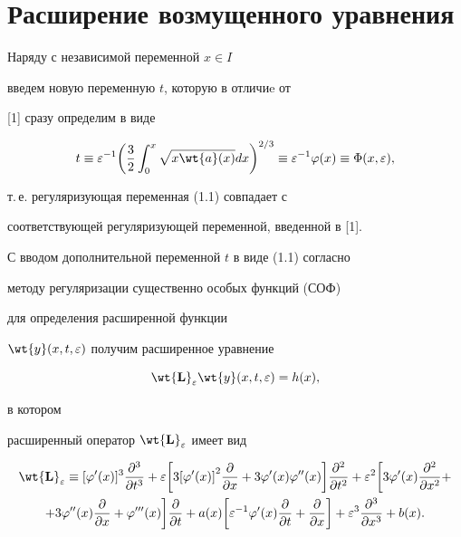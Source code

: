 \section{Расширение возмущенного уравнения}





Наряду с независимой переменной $x \in I$


введем новую переменную $t$, которую в отличиe от


[1] сразу определим в виде


\begin{equation}


t \equiv \e^{-1}\bigg( \frac{3}{2} \int_0^x \sqrt{x \wt{a}


(x)} d x \bigg)^{2/3}\equiv \e^{-1} \f (x) \equiv \Phi (x, \e),


\end{equation}


т.\,е. регуляризующая переменная (1.1) совпадает с


соответствующей регуляризующей переменной, введенной в [1].





С вводом дополнительной переменной $t$ в виде (1.1) согласно


методу регуляризации существенно особых функций (СОФ)


для определения расширенной функции


$\wt{y} (x, t, \e )$ получим расширенное уравнение


\begin{equation}


\wt{\bold{L}}_{\e} \wt{y} (x, t, \e ) = h(x),


\end{equation}


в котором


расширенный оператор $\wt{\bold{L}}_{\e}$ имеет вид


\begin{multline}


\wt{\bold{L}}_{\e} \equiv [{\f ' (x)}]^3 \frac{\d^3}{\d


t^3} + \e \bigg[3 [{\f ' (x)]}^2 \frac{\d}{\d x} + 3 \f ' (x) \f


'' (x) \bigg] \frac{\d^2}{\d t^2} + \e^{2} \bigg[ 3 \f ' (x)


\frac{\d^2}{\d x^2 } + \\


%


+ 3 \f '' (x) \frac{\d}{\d x} + \f ''' (x) \bigg] \frac


{\d}{\d t} + a(x)\bigg [ \e^{-1} \f ' (x) \frac{\d}{\d t} +


\frac{\d}{\d x}\bigg ] + \e^3 \frac{\d^3}{\d x^3} + b(x).


\end{multline}





